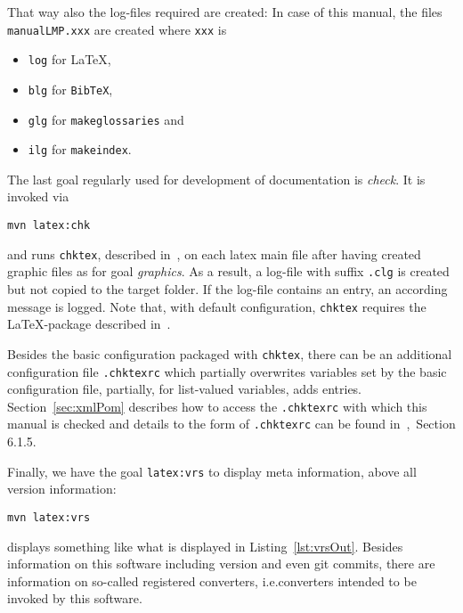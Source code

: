 
That way also the log-files required are created: 
In case of this manual, 
the files \texttt{manualLMP.xxx} are created 
where \texttt{xxx} is 
%
\begin{itemize}
\item
\texttt{log} for \LaTeX, 
\item
\texttt{blg} for \texttt{BibTeX}, 
\item
\texttt{glg} for \texttt{makeglossaries} and 
\item
\texttt{ilg} for \texttt{makeindex}. 
\end{itemize}

The last goal regularly used for development of documentation is \emph{check}. 
It is invoked via 
% 
\begin{Verbatim}
mvn latex:chk
\end{Verbatim}
%
and runs \texttt{chktex}, described in~\cite{ChkTeX22}, 
on each latex main file 
after having created graphic files as for goal \emph{graphics}. 
As a result, a log-file with suffix \texttt{.clg} is created 
but not copied to the target folder. 
If the log-file contains an entry, 
an according message is logged. 
Note that, with default configuration, 
\texttt{chktex} requires the \LaTeX-package  
described in~\cite{BooktP}. 

Besides the basic configuration packaged with \texttt{chktex}, 
there can be an additional configuration file \texttt{.chktexrc} 
which partially overwrites variables set by the basic configuration file, 
partially, for list-valued variables, adds entries. 
Section~\ref{sec:xmlPom} describes how to access the \texttt{.chktexrc} 
with which this manual is checked and 
details to the form of \texttt{.chktexrc} can be found in~\cite{ChkTeX22},~Section 6.1.5.  



Finally, we have the goal \texttt{latex:vrs}
to display meta information, above all version information:
% 
\begin{Verbatim}
mvn latex:vrs
\end{Verbatim}
%
displays something like what is displayed in Listing~\ref{lst:vrsOut}. 
Besides information on this software including version and even git commits, 
there are information on so-called registered converters, 
i.e.\@ converters intended to be invoked by this software. 

